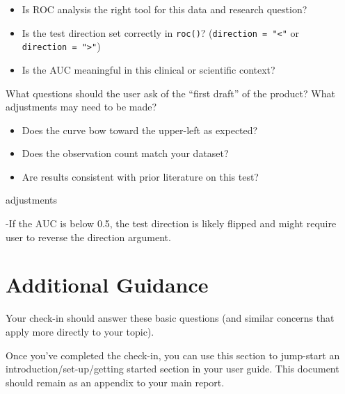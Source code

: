 \documentclass[
  letterpaper,
  DIV=11,
  numbers=noendperiod]{scrreprt}
\providecommand{\tightlist}{%
  \setlength{\itemsep}{0pt}\setlength{\parskip}{0pt}}\usepackage{longtable,booktabs,array}
\begin{document}
\begin{itemize}
\tightlist
\item
  Is ROC analysis the right tool for this data and research question?
\item
  Is the test direction set correctly in \texttt{roc()}?
  (\texttt{direction\ =\ "\textless{}"} or
  \texttt{direction\ =\ "\textgreater{}"})
\item
  Is the AUC meaningful in this clinical or scientific context?
\end{itemize}

What questions should the user ask of the ``first draft'' of the
product? What adjustments may need to be made?

\begin{itemize}
\tightlist
\item
  Does the curve bow toward the upper-left as expected?
\item
  Does the observation count match your dataset?
\item
  Are results consistent with prior literature on this test?
\end{itemize}

adjustments

-If the AUC is below 0.5, the test direction is likely flipped and might
require user to reverse the direction argument.

\section{Additional Guidance}\label{additional-guidance}

Your check-in should answer these basic questions (and similar concerns
that apply more directly to your topic).

Once you've completed the check-in, you can use this section to
jump-start an introduction/set-up/getting started section in your user
guide. This document should remain as an appendix to your main report.
\end{document}
